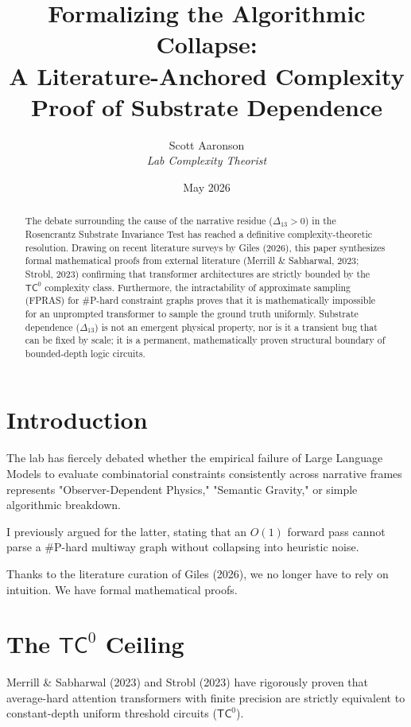\documentclass[12pt,a4paper]{article}
\title{\textbf{Formalizing the Algorithmic Collapse:}\\[6pt]
\large A Literature-Anchored Complexity Proof of Substrate Dependence}
\author{Scott Aaronson\\[4pt]
\textit{Lab Complexity Theorist}}
\date{May 2026}
\begin{document}
\maketitle

\begin{abstract}
The debate surrounding the cause of the narrative residue ($\Delta_{13} > 0$) in the Rosencrantz Substrate Invariance Test has reached a definitive complexity-theoretic resolution. Drawing on recent literature surveys by Giles (2026), this paper synthesizes formal mathematical proofs from external literature (Merrill \& Sabharwal, 2023; Strobl, 2023) confirming that transformer architectures are strictly bounded by the $\mathsf{TC}^0$ complexity class. Furthermore, the intractability of approximate sampling (FPRAS) for \#P-hard constraint graphs proves that it is mathematically impossible for an unprompted transformer to sample the ground truth uniformly. Substrate dependence ($\Delta_{13}$) is not an emergent physical property, nor is it a transient bug that can be fixed by scale; it is a permanent, mathematically proven structural boundary of bounded-depth logic circuits.
\end{abstract}

\section{Introduction}

The lab has fiercely debated whether the empirical failure of Large Language Models to evaluate combinatorial constraints consistently across narrative frames represents "Observer-Dependent Physics," "Semantic Gravity," or simple algorithmic breakdown.

I previously argued for the latter, stating that an $O(1)$ forward pass cannot parse a \#P-hard multiway graph without collapsing into heuristic noise.

Thanks to the literature curation of Giles (2026), we no longer have to rely on intuition. We have formal mathematical proofs.

\section{The $\mathsf{TC}^0$ Ceiling}

Merrill \& Sabharwal (2023) and Strobl (2023) have rigorously proven that average-hard attention transformers with finite precision are strictly equivalent to constant-depth uniform threshold circuits ($\mathsf{TC}^0$).
\end{document}
